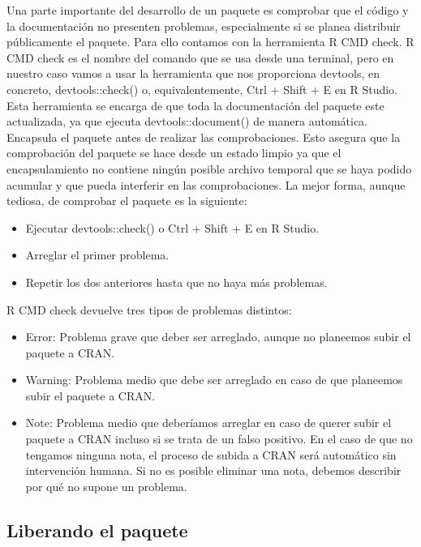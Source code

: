 Una parte importante del desarrollo de un paquete es comprobar que el c\'odigo y la
documentaci\'on no presenten problemas, especialmente si se planea distribuir p\'ublicamente
el paquete. Para ello contamos con la herramienta R CMD check.
R CMD check es el nombre del comando que se usa desde una terminal, pero en nuestro
caso vamos a usar la herramienta que nos proporciona devtools, en concreto,
devtools::check() o, equivalentemente, Ctrl + Shift + E en R Studio.
Esta herramienta se encarga de que toda la documentaci\'on del paquete este actualizada, ya
que ejecuta devtools::document() de manera autom\'atica.
Encapsula el paquete antes de realizar las comprobaciones. Esto asegura que la
comprobaci\'on del paquete se hace desde un estado limpio ya que el encapsulamiento no
contiene ning\'un posible archivo temporal que se haya podido acumular y que pueda interferir
en las comprobaciones.
La mejor forma, aunque tediosa, de comprobar el paquete es la siguiente:

\begin{itemize}
    \item Ejecutar devtools::check() o Ctrl + Shift + E en R Studio.
    \item Arreglar el primer problema.
    \item Repetir los dos anteriores hasta que no haya m\'as problemas.
\end{itemize}

R CMD check devuelve tres tipos de problemas distintos:

\begin{itemize}
    \item Error: Problema grave que deber ser arreglado, aunque no planeemos subir el
paquete a CRAN.
    \item Warning: Problema medio que debe ser arreglado en caso de que planeemos subir
el paquete a CRAN.
    \item Note: Problema medio que deber\'iamos arreglar en caso de querer subir el paquete a
CRAN incluso si se trata de un falso positivo. En el caso de que no tengamos ninguna
nota, el proceso de subida a CRAN ser\'a autom\'atico sin intervenci\'on humana. Si no
es posible eliminar una nota, debemos describir por qu\'e no supone un problema.
\end{itemize}


\subsection{Liberando el paquete}

